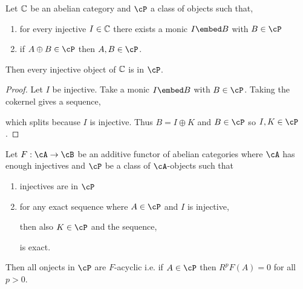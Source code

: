 \documentclass[12pt]{article}
\begin{document}
\begin{prop}
Let $\mathbb{C}$ be an abelian category and $\cP$ a class of objects such that,
\begin{enumerate}
\item for every injective $I \in \mathbb{C}$ there exists a monic $I \embed B$ with $B \in \cP$
\item if $A \oplus B \in \cP$ then $A, B \in \cP$.
\end{enumerate}
Then every injective object of $\mathbb{C}$ is in $\cP$.
\end{prop}

\begin{proof}
Let $I$ be injective. Take a monic $I \embed B$ with $B \in \cP$. Taking the cokernel gives a sequence,
\begin{center}
\end{center}
which splits because $I$ is injective. Thus $B = I \oplus K$ and $B \in \cP$ so $I, K \in \cP$.
\end{proof}

\begin{prop}
Let $F : \cA \to \cB$ be an additive functor of abelian categories where $\cA$ has enough injectives and $\cP$ be a class of $\cA$-objects such that
\begin{enumerate}
\item injectives are in $\cP$ 
\item for any exact sequence where $A \in \cP$ and $I$ is injective,
\begin{center}
\end{center} 
then also $K \in \cP$ and the sequence,
\begin{center}
\end{center}
is exact.
\end{enumerate}
Then all onjects in $\cP$ are $F$-acyclic i.e. if $A \in \cP$ then $R^p F(A) = 0$ for all $p > 0$.
\end{prop}
\end{document}

